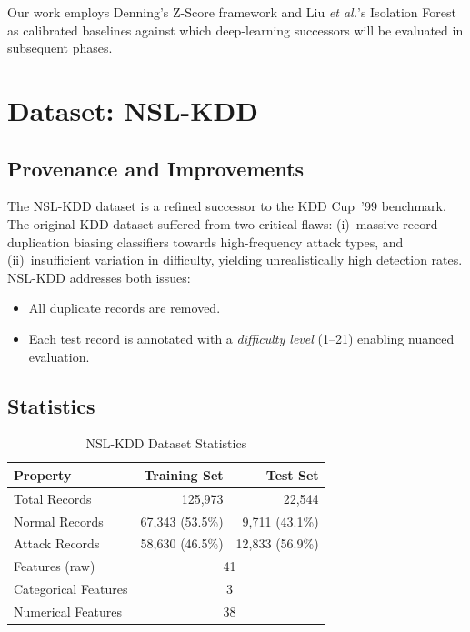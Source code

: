 \documentclass[conference]{IEEEtran}
\begin{document}
Our work employs Denning's Z-Score framework and Liu \emph{et al.}'s Isolation
Forest as calibrated baselines against which deep-learning successors will be
evaluated in subsequent phases.

\section{Dataset: NSL-KDD}
\label{sec:dataset}

\subsection{Provenance and Improvements}
The NSL-KDD dataset \cite{tavallaee2009} is a refined successor to the KDD Cup~'99
benchmark.  The original KDD dataset suffered from two critical flaws: (i)~massive
record duplication biasing classifiers towards high-frequency attack types, and
(ii)~insufficient variation in difficulty, yielding unrealistically high detection
rates.  NSL-KDD addresses both issues:
\begin{itemize}
  \item All duplicate records are removed.
  \item Each test record is annotated with a \emph{difficulty level} (1--21)
        enabling nuanced evaluation.
\end{itemize}

\subsection{Statistics}
\begin{table}[H]
  \centering
  \caption{NSL-KDD Dataset Statistics}
  \label{tab:dataset}
  \begin{tabular}{lrr}
    \toprule
    \textbf{Property}          & \textbf{Training Set} & \textbf{Test Set} \\
    \midrule
    Total Records              & 125,973               & 22,544            \\
    Normal Records             & 67,343 (53.5\%)       & 9,711 (43.1\%)    \\
    Attack Records             & 58,630 (46.5\%)       & 12,833 (56.9\%)   \\
    Features (raw)             & \multicolumn{2}{c}{41}                    \\
    Categorical Features       & \multicolumn{2}{c}{3}                     \\
    Numerical Features         & \multicolumn{2}{c}{38}                    \\
    \bottomrule
  \end{tabular}
\end{table}
\end{document}
